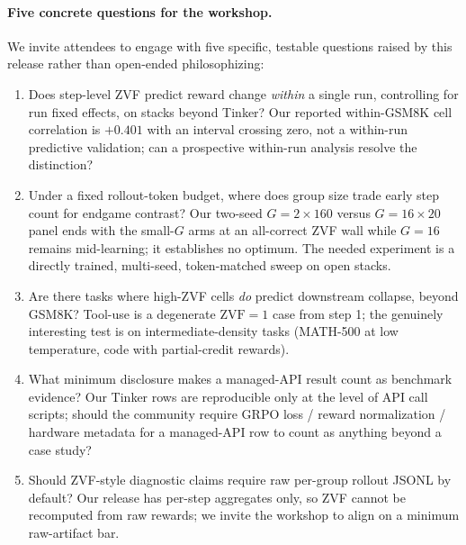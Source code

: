 \paragraph{Five concrete questions for the workshop.}
We invite attendees to engage with five specific, testable questions raised
by this release rather than open-ended philosophizing:
\begin{enumerate}[leftmargin=1.4em,topsep=2pt,itemsep=2pt]
  \item Does step-level ZVF predict reward change \emph{within} a single
        run, controlling for run fixed effects, on stacks beyond Tinker?
        Our reported within-GSM8K cell correlation is $+0.401$ with an
        interval crossing zero, not a within-run predictive validation;
        can a prospective within-run analysis resolve the distinction?
  \item Under a fixed rollout-token budget, where does group size trade early
        step count for endgame contrast? Our two-seed $G{=}2\times160$ versus
        $G{=}16\times20$ panel ends with the small-$G$ arms at an all-correct
        ZVF wall while $G{=}16$ remains mid-learning; it establishes no
        optimum. The needed experiment
        is a directly trained, multi-seed, token-matched sweep on open stacks.
  \item Are there tasks where high-ZVF cells \emph{do} predict downstream
        collapse, beyond GSM8K? Tool-use is a degenerate $\mathrm{ZVF}{=}1$
        case from step 1; the genuinely interesting test is on
        intermediate-density tasks (MATH-500 at low temperature, code
        with partial-credit rewards).
  \item What minimum disclosure makes a managed-API result count as
        benchmark evidence? Our Tinker rows are reproducible only at the
        level of API call scripts; should the community require GRPO
        loss / reward normalization / hardware metadata for a managed-API
        row to count as anything beyond a case study?
  \item Should ZVF-style diagnostic claims require raw per-group rollout
        JSONL by default? Our release has per-step aggregates only, so
        ZVF cannot be recomputed from raw rewards; we invite the workshop
        to align on a minimum raw-artifact bar.
\end{enumerate}

